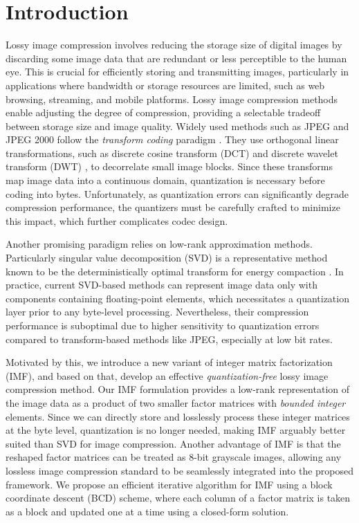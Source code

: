 \section{Introduction} \label{sec: introduction}

Lossy image compression involves reducing the storage size of digital images by discarding some image data that are redundant or less perceptible to the human eye. This is crucial for efficiently storing and transmitting images, particularly in applications where bandwidth or storage resources are limited, such as web browsing, streaming, and mobile platforms. Lossy image compression methods enable adjusting the degree of compression, providing a selectable tradeoff between storage size and image quality. Widely used methods such as JPEG \cite{wallace1991jpeg} and JPEG 2000 \cite{skodras2001jpeg} follow the \emph{transform coding} paradigm \cite{goyal2001theoretical}. They use orthogonal linear transformations, such as discrete cosine transform (DCT) \cite{ahmed1974discrete} and discrete wavelet transform (DWT) \cite{antonini1992image}, to decorrelate small image blocks. Since these transforms map image data into a continuous domain, quantization is necessary before coding into bytes. Unfortunately, as quantization errors can significantly degrade compression performance, the quantizers must be carefully crafted to minimize this impact, which further complicates codec design.

Another promising paradigm relies on low-rank approximation methods. Particularly singular value decomposition (SVD) is a representative method known to be the deterministically optimal transform for energy compaction \cite{andrews1976singular}. In practice, current SVD-based methods \cite{andrews1976singular, prasantha2007image, hou2015sparse} can represent image data only with components containing floating-point elements, which necessitates a quantization layer prior to any byte-level processing. Nevertheless, their compression performance is suboptimal due to higher sensitivity to quantization errors compared to transform-based methods like JPEG, especially at low bit rates.

Motivated by this, we introduce a new variant of integer matrix factorization (IMF), and based on that, develop an effective \emph{quantization-free} lossy image compression method. Our IMF formulation provides a low-rank representation of the image data as a product of two smaller factor matrices with \emph{bounded integer} elements. Since we can directly store and losslessly process these integer matrices at the byte level, quantization is no longer needed, making IMF arguably better suited than SVD for image compression. Another advantage of IMF is that the reshaped factor matrices can be treated as 8-bit grayscale images, allowing any lossless image compression standard to be seamlessly integrated into the proposed framework. We propose an efficient iterative algorithm for IMF using a block coordinate descent (BCD) scheme, where each column of a factor matrix is taken as a block and updated one at a time using a closed-form solution.
 
